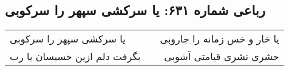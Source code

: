 \begin{center}
\section*{رباعی شماره ۶۳۱: یا سرکشی سپهر را سرکوبی}
\label{sec:sh631}
\begin{longtable}{l p{0.5cm} r}
یا سرکشی سپهر را سرکوبی
&&
یا خار و خس زمانه را جاروبی
\\
بگرفت دلم ازین خسیسان یا رب
&&
حشری نشری قیامتی آشوبی
\\
\end{longtable}
\end{center}

